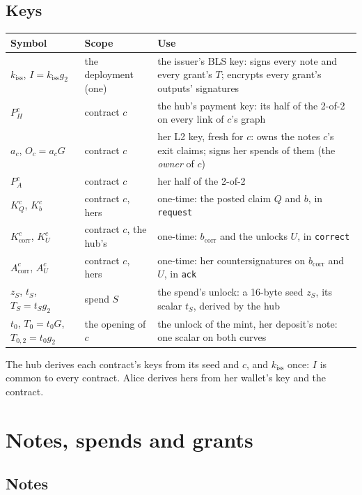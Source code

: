 \documentclass[11pt]{article}
\theoremstyle{plain}
\theoremstyle{definition}
\newcommand{\bcorr}{b_{\mathrm{corr}}}
\newcommand{\tx}[1]{\texttt{#1}}
\newcommand{\kiss}{k_{\mathrm{iss}}}
\newcommand{\PH}{P_H^{c}}
\newcommand{\Oc}{O_c}
\newcommand{\KQ}{K_{Q}^{c}}
\newcommand{\Kb}{K_{b}^{c}}
\newcommand{\Kcorr}{K_{\mathrm{corr}}^{c}}
\newcommand{\KU}{K_{U}^{c}}
\newcommand{\Acorr}{A_{\mathrm{corr}}^{c}}
\newcommand{\AU}{A_{U}^{c}}
\begin{document}
\subsection{Keys}

\begin{center}
\begin{tabularx}{\linewidth}{llL}
\toprule
Symbol & Scope & Use \\
\midrule
$\kiss$, $I = \kiss g_2$ & the deployment (one) & the issuer's BLS key: signs every note and every grant's $T$; encrypts every grant's outputs' signatures \\
$\PH$ & contract $c$ & the hub's payment key: its half of the 2-of-2 on every link of $c$'s graph \\
$a_c$, $\Oc = a_cG$ & contract $c$ & her L2 key, fresh for $c$: owns the notes $c$'s exit claims; signs her spends of them (the \emph{owner} of $c$) \\
$P_A^c$ & contract $c$ & her half of the 2-of-2 \\
$\KQ$, $\Kb$ & contract $c$, hers & one-time: the posted claim $Q$ and $b$, in \tx{request} \\
$\Kcorr$, $\KU$ & contract $c$, the hub's & one-time: $\bcorr$ and the unlocks $U$, in \tx{correct} \\
$\Acorr$, $\AU$ & contract $c$, hers & one-time: her countersignatures on $\bcorr$ and $U$, in \tx{ack} \\
$z_S$, $t_S$, $T_S = t_S g_2$ & spend $S$ & the spend's unlock: a 16-byte seed $z_S$, its scalar $t_S$, derived by the hub \\
$t_0$, $T_0 = t_0G$, $T_{0,2} = t_0 g_2$ & the opening of $c$ & the unlock of the mint, her deposit's note: one scalar on both curves \\
\bottomrule
\end{tabularx}
\end{center}

The hub derives each contract's keys from its seed and $c$, and $\kiss$
once: $I$ is common to every contract. Alice derives hers from her
wallet's key and the contract.

\section{Notes, spends and grants}

\subsection{Notes}
\end{document}
